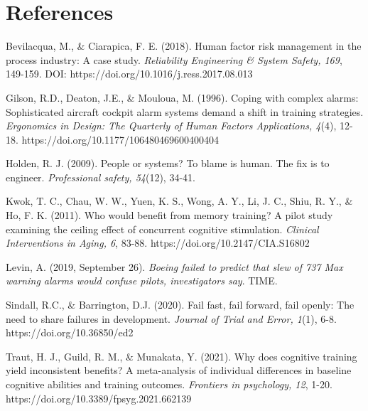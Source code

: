 \documentclass{article}
\begin{document}
\section{References }

Bevilacqua, M., \& Ciarapica, F. E. (2018). Human factor risk management in the process industry: A case study. \emph{Reliability Engineering \& System Safety, 169}, 149-159. DOI: https://doi.org/10.1016/j.ress.2017.08.013



Gilson, R.D., Deaton, J.E., \& Mouloua, M. (1996). Coping with complex alarms: Sophisticated aircraft cockpit alarm systems demand a shift in training strategies. \emph{Ergonomics in Design: The Quarterly of Human Factors Applications, 4}(4), 12-18. https://doi.org/10.1177/106480469600400404



Holden, R. J. (2009). People or systems? To blame is human. The fix is to engineer. \emph{Professional safety, 54}(12), 34-41. 

Kwok, T. C., Chau, W. W., Yuen, K. S., Wong, A. Y., Li, J. C., Shiu, R. Y., \& Ho, F. K. (2011). Who would benefit from memory training? A pilot study examining the ceiling effect of concurrent cognitive stimulation. \emph{Clinical Interventions in Aging, 6}, 83-88. https://doi.org/10.2147/CIA.S16802

Levin, A. (2019, September 26). \emph{Boeing failed to predict that slew of 737 Max warning alarms would confuse pilots, investigators say}. TIME.  

Sindall, R.C., \& Barrington, D.J. (2020). Fail fast, fail forward, fail openly: The need to share failures in development. \emph{Journal of Trial and Error, 1}(1), 6-8. https://doi.org/10.36850/ed2 

Traut, H. J., Guild, R. M., \& Munakata, Y. (2021). Why does cognitive training yield inconsistent benefits? A meta-analysis of individual differences in baseline cognitive abilities and training outcomes.\emph{ Frontiers in psychology, 12}, 1-20. https://doi.org/10.3389/fpsyg.2021.662139
\end{document}
